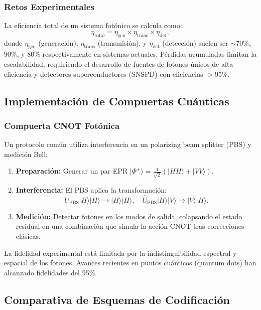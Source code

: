 \documentclass{article}
\begin{document}
\subsubsection*{Retos Experimentales}

La eficiencia total de un sistema fotónico se calcula como:
\[
\eta_{\text{total}} = \eta_{\text{gen}} \times \eta_{\text{trans}} \times \eta_{\text{det}},
\]
donde $\eta_{\text{gen}}$ (generación), $\eta_{\text{trans}}$ (transmisión), y $\eta_{\text{det}}$ (detección) suelen ser $\sim 70\%$, $90\%$, y $80\%$ respectivamente en sistemas actuales. Pérdidas acumuladas limitan la escalabilidad, requiriendo el desarrollo de fuentes de fotones únicos de alta eficiencia y detectores superconductores (SNSPD) con eficiencias $>$95\%.

\subsection*{Implementación de Compuertas Cuánticas}

\subsubsection*{Compuerta CNOT Fotónica}

Un protocolo común utiliza interferencia en un polarizing beam splitter (PBS) y medición Bell:

\begin{enumerate}
    \item \textbf{Preparación:} Generar un par EPR $|\Phi^+\rangle = \frac{1}{\sqrt{2}}(|HH\rangle + |VV\rangle)$.
    \item \textbf{Interferencia:} El PBS aplica la transformación:
    \[
    \hat{U}_{\text{PBS}}|H\rangle|H\rangle \rightarrow |H\rangle|H\rangle, \quad \hat{U}_{\text{PBS}}|H\rangle|V\rangle \rightarrow |V\rangle|H\rangle.
    \]
    \item \textbf{Medición:} Detectar fotones en los modos de salida, colapsando el estado residual en una combinación que simula la acción CNOT tras correcciones clásicas.
\end{enumerate}

La fidelidad experimental está limitada por la indistinguibilidad espectral y espacial de los fotones. Avances recientes en puntos cuánticos (quantum dots) han alcanzado fidelidades del 95\%.

\subsection*{Comparativa de Esquemas de Codificación}
\end{document}

